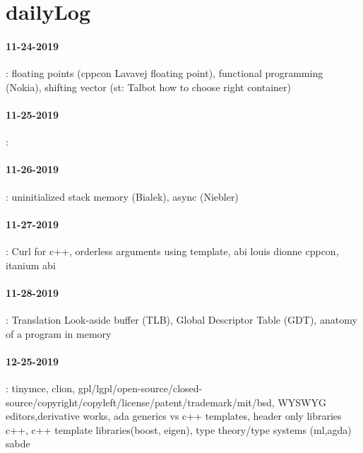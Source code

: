 \section{dailyLog}
\paragraph{11-24-2019}: floating points (cppcon Lavavej floating point), functional programming (Nokia), shifting vector (st: Talbot how to choose right container)
\paragraph{11-25-2019}:
\paragraph{11-26-2019}: uninitialized stack memory (Bialek), async (Niebler) 
\paragraph{11-27-2019}: Curl for c++, orderless arguments using template, abi louis dionne cppcon, itanium abi
\paragraph{11-28-2019}: Translation Look-aside buffer (TLB), Global Descriptor Table (GDT), anatomy of a program in memory 
\paragraph{12-25-2019}: tinymce, clion, gpl/lgpl/open-source/closed-source/copyright/copyleft/license/patent/trademark/mit/bsd, WYSWYG editors,derivative works, ada generics vs c++ templates, header only libraries c++, c++ template libraries(boost, eigen), type theory/type systems
(ml,agda)
sabde

